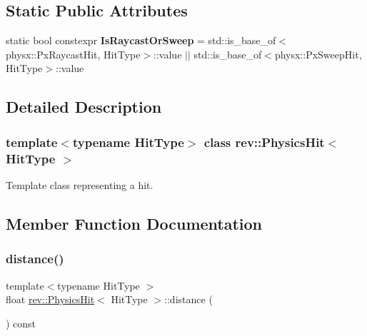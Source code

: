 \subsection*{Static Public Attributes}
\begin{DoxyCompactItemize}
\item 
\mbox{\label{classrev_1_1_physics_hit_ad2fea9ce328b08e6e82eb21fdddd36b9}} 
static bool constexpr {\bfseries Is\+Raycast\+Or\+Sweep} = std\+::is\+\_\+base\+\_\+of$<$physx\+::\+Px\+Raycast\+Hit, Hit\+Type$>$\+::value $\vert$$\vert$ std\+::is\+\_\+base\+\_\+of$<$physx\+::\+Px\+Sweep\+Hit, Hit\+Type$>$\+::value
\end{DoxyCompactItemize}


\subsection{Detailed Description}
\subsubsection*{template$<$typename Hit\+Type$>$\newline
class rev\+::\+Physics\+Hit$<$ Hit\+Type $>$}

Template class representing a hit. 

\subsection{Member Function Documentation}
\mbox{\label{classrev_1_1_physics_hit_a62d6dd0cd3715a1e6b0b028815c03074}} 
\subsubsection{\texorpdfstring{distance()}{distance()}}
{\footnotesize\ttfamily template$<$typename Hit\+Type $>$ \\
float \mbox{\hyperlink{classrev_1_1_physics_hit}{rev\+::\+Physics\+Hit}}$<$ Hit\+Type $>$\+::distance (\begin{DoxyParamCaption}{ }\end{DoxyParamCaption}) const\hspace{0.3cm}{\ttfamily [inline]}}

